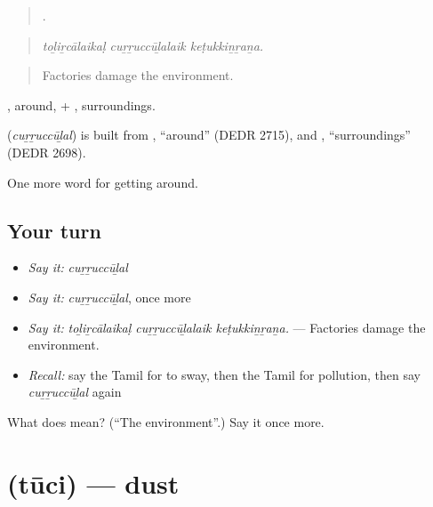 \begin{quote}
  .
\end{quote}

\begin{quote}
\emph{toḻiṟcālaikaḷ cuṟṟuccūḻalaik keṭukkiṉṟaṉa.}
\end{quote}

\begin{quote}
Factories damage the environment.
\end{quote}

, around, + , surroundings.

\begin{cousinweb}
\textbf{} (\emph{cuṟṟuccūḻal}) is built from , \textquotedblleft{}around\textquotedblright{} (DEDR 2715), and , \textquotedblleft{}surroundings\textquotedblright{} (DEDR 2698).
\end{cousinweb}

\begin{grammarlens}[title={What you've built}]
One more word for getting around.
\end{grammarlens}

\subsection*{Your turn}
\begin{itemize}
\raggedright
  \item \emph{Say it:} \emph{cuṟṟuccūḻal}
  \item \emph{Say it:} \emph{cuṟṟuccūḻal}, once more
  \item \emph{Say it:} \emph{toḻiṟcālaikaḷ cuṟṟuccūḻalaik keṭukkiṉṟaṉa.} — Factories damage the environment.
  \item \emph{Recall:} say the Tamil for to sway, then the Tamil for pollution, then say \emph{cuṟṟuccūḻal} again
\end{itemize}

\begin{tcolorbox}[breakable,colback=teal!4,colframe=teal!35!black,title={Before you move on}]
What does  mean? (\textquotedblleft{}The environment\textquotedblright{}.) Say it once more.
\end{tcolorbox}
\section[\texorpdfstring{\ta{தூசி} (tūci)}{தூசி (tūci)}]{ (tūci) — dust}


